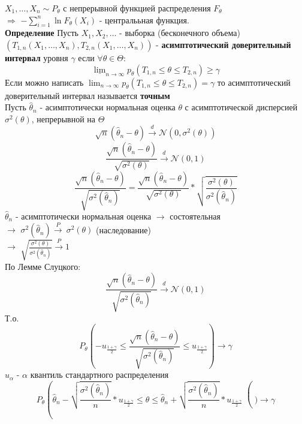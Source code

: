 \documentclass{article}
\begin{document}
$X_1,\dots,X_n\sim P_\theta$ с непрерывной функцией распределения $F_\theta$\\
$\Rightarrow$ $-\sum_{i=1}^n\ln{F_\theta(X_i)}$ - централььная функция.\\
\textbf{Определение}
Пусть $X_1,X_2,\dots$ - выборка (бесконечного объема)\\
$(T_{1,n}(X_1,\dots,X_n),T_{2,n}(X_1,\dots,X_n))$ - \textbf{асимптотический доверительный интервал} уровня $\gamma$ если $\forall\theta\in\Theta$:
$$ \underline{\lim}_{n\rightarrow\infty}p_\theta(T_{1,n}\leq\theta\leq T_{2,n})\geq\gamma $$
Если можно написать $\lim_{n\rightarrow\infty}p_\theta(T_{1,n}\leq\theta\leq T_{2,n})=\gamma$ то асимптотический доверительный интервал называется \textbf{точным}\\
Пусть $\widehat{\theta}_n$ - асимптотически нормальная оценка $\theta$ с асимптотической дисперсией 
$\sigma^2(\theta)$, непрерывной на $\Theta$\\
$$ \sqrt{n}(\widehat{\theta}_n - \theta) \xrightarrow{d} \mathcal{N}(0,\sigma^2(\theta)) $$
$$ \frac{\sqrt{n}(\widehat{\theta}_n - \theta)}{\sqrt{\sigma^2(\theta)}} \xrightarrow{d} \mathcal{N}(0,1)$$
$$ \frac{\sqrt{n}(\widehat{\theta}_n - \theta)}{\sqrt{\sigma^2(\widehat{\theta}_n)}} = 
\frac{\sqrt{n}(\widehat{\theta}_n - \theta)}{\sqrt{\sigma^2(\theta)}} * \sqrt{\frac{\sigma^2(\theta)}{\sigma^2(\widehat{\theta}_n)}} $$
$\widehat{\theta}_n$ - асимптотически нормальная оценка $\rightarrow$ состоятельная\\
$\rightarrow$ $\sigma^2(\widehat{\theta}_n)\xrightarrow{P}\ \sigma^2(\theta)$ (наследование)\\
$\rightarrow$ $\sqrt{\frac{\sigma^2(\theta)}{\sigma^2(\widehat{\theta}_n)}} \xrightarrow{P} 1$\\
По Лемме Слуцкого: 
$$\frac{\sqrt{n}(\widehat{\theta}_n - \theta)}{\sqrt{\sigma^2(\widehat{\theta}_n)}}
\xrightarrow{d} \mathcal{N}(0,1) $$
Т.о.
$$ P_\theta\left(-u_{\frac{1+\gamma}{2}}\leq \frac{\sqrt{n}(\widehat{\theta}_n - \theta)}{\sqrt{\sigma^2(\widehat{\theta}_n)}} \leq u_{\frac{1+\gamma}{2}}\right) \rightarrow \gamma  $$
$u_\alpha$ - $\alpha$ квантиль стандартного распределения
$$ 
P_\theta \left(\widehat{\theta}_n - 
\sqrt{\frac{\sigma^2(\widehat{\theta}_n)}{n}}*u_{\frac{1+\gamma}{2}}
\leq \theta \leq 
\widehat{\theta}_n + \sqrt{\frac{\sigma^2(\widehat{\theta}_n)}{n}}*u_{\frac{1+\gamma}{2}}\right()
 \rightarrow \gamma $$
\end{document}
